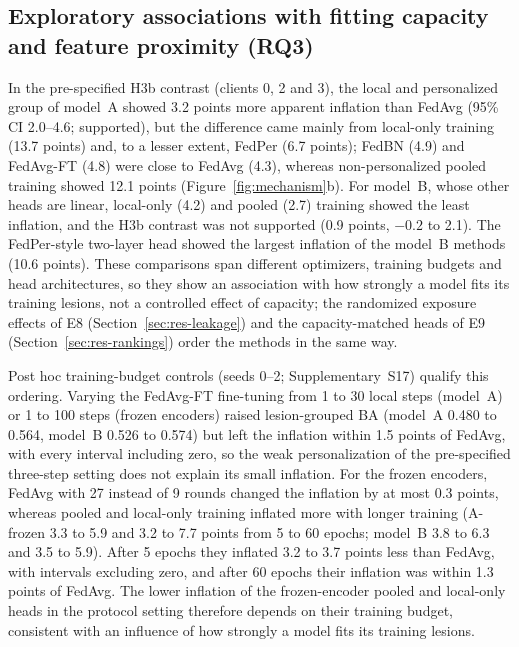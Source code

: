 \documentclass[VANCOUVER,Times1COL]{WileyNJDv5}
\begin{document}
\subsection{Exploratory associations with fitting capacity and feature proximity (RQ3)}
\label{sec:res-mechanism}

In the pre-specified H3b contrast (clients 0, 2 and 3), the local and personalized group of model~A showed
3.2 points more apparent inflation than FedAvg (95\% CI 2.0--4.6; supported), but the difference came
mainly from local-only training (13.7 points) and, to a lesser extent, FedPer (6.7 points); FedBN (4.9) and
FedAvg-FT (4.8) were close to FedAvg (4.3), whereas non-personalized pooled training showed 12.1 points
(Figure~\ref{fig:mechanism}b). For model~B, whose other heads are linear, local-only (4.2) and pooled (2.7)
training showed the least inflation, and the H3b contrast was not supported (0.9 points, $-0.2$ to 2.1).
The FedPer-style two-layer head showed the largest inflation of the model~B methods (10.6 points). These
comparisons span different optimizers, training budgets and head architectures, so they show an
association with how strongly a model fits its training lesions, not a controlled effect of capacity; the
randomized exposure effects of E8 (Section~\ref{sec:res-leakage}) and the capacity-matched heads of E9
(Section~\ref{sec:res-rankings}) order the methods in the same way.

Post hoc training-budget controls (seeds 0--2; Supplementary~S17) qualify this ordering. Varying the
FedAvg-FT fine-tuning from 1 to 30 local steps (model~A) or 1 to 100 steps (frozen encoders) raised
lesion-grouped BA (model~A 0.480 to 0.564, model~B 0.526 to 0.574) but left the inflation within 1.5 points
of FedAvg, with every interval including zero, so the weak personalization of the pre-specified three-step
setting does not explain its small inflation. For the frozen encoders, FedAvg with 27 instead of 9 rounds
changed the inflation by at most 0.3 points, whereas pooled and local-only training inflated more with
longer training (A-frozen 3.3 to 5.9 and 3.2 to 7.7 points from 5 to 60 epochs; model~B 3.8 to 6.3 and 3.5 to
5.9). After 5 epochs they inflated 3.2 to 3.7 points less than FedAvg, with intervals excluding zero, and
after 60 epochs their inflation was within 1.3 points of FedAvg. The lower inflation of the frozen-encoder
pooled and local-only heads in the protocol setting therefore depends on their training budget, consistent
with an influence of how strongly a model fits its training lesions.
\end{document}
